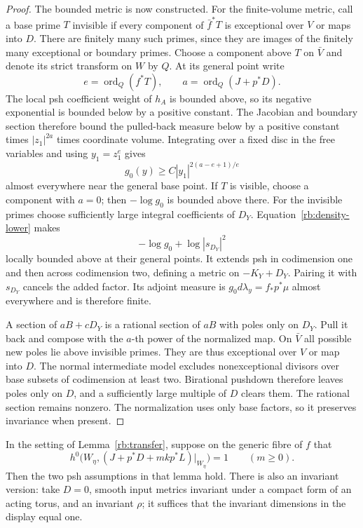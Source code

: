 \begin{proof}
The bounded metric is now constructed. For the finite-volume metric,
call a base prime $T$ invisible if every component of $\bar f^*T$ is
exceptional over $V$ or maps into $D$.  There are finitely many such
primes, since they are images of the finitely many exceptional or
boundary primes. Choose a component above $T$ on $\bar V$ and denote
its strict transform on $W$ by $Q$. At its general point write
\[
 e=\operatorname{ord}_Q(f^*T),\qquad
 a=\operatorname{ord}_Q(J+p^*D).
\]
The local psh coefficient weight of $h_A$ is bounded above, so its
negative exponential is bounded below by a positive constant. The
Jacobian and boundary section therefore bound the pulled-back measure
below by a positive constant times $|z_1|^{2a}$ times coordinate volume.
Integrating over
a fixed disc in the free variables and using $y_1=z_1^e$ gives
\begin{equation}\label{rb:density-lower}
              g_0(y)\geq C|y_1|^{2(a-e+1)/e}
\end{equation}
almost everywhere near the general base point.  If $T$ is visible,
choose a component with $a=0$; then $-\log g_0$ is bounded above there.
For the invisible primes choose sufficiently large integral
coefficients of $D_Y$.  Equation~\eqref{rb:density-lower} makes
\[
                  -\log g_0+\log|s_{D_Y}|^2
\]
locally bounded above at their general points.  It extends psh in
codimension one and then across codimension two, defining a metric on
$-K_Y+D_Y$.  Pairing it with $s_{D_Y}$ cancels the added factor.  Its
adjoint measure is $g_0d\lambda_y=f_*p^*\mu$ almost everywhere and is
therefore finite.

A section of $aB+cD_Y$ is a rational section of $aB$ with poles only on
$D_Y$.  Pull it back and compose with the $a$-th power of the normalized
map.  On $\bar V$ all possible new poles lie above invisible primes.
They are thus exceptional over $V$ or map into $D$.  The normal
intermediate model excludes nonexceptional divisors over base subsets
of codimension at least two.  Birational pushdown therefore leaves
poles only on $D$, and a sufficiently large multiple of $D$ clears
them.  The rational section remains nonzero.  The normalization uses
only base factors, so it preserves invariance when present.
\end{proof}

\begin{lemma}\label{g:moments}\label{rb:rank-one}
In the setting of Lemma~\ref{rb:transfer}, suppose on the generic fibre
of $f$ that
\[
 h^0\bigl(W_\eta,(J+p^*D+mkp^*L)|_{W_\eta}\bigr)=1
                       \qquad(m\geq0).
\]
Then the two psh assumptions in that lemma hold.  There is also an
invariant version: take $D=0$, smooth input metrics invariant under a
compact form of an acting torus, and an invariant $\rho$; it suffices
that the invariant dimensions in the display equal one.
\end{lemma}

